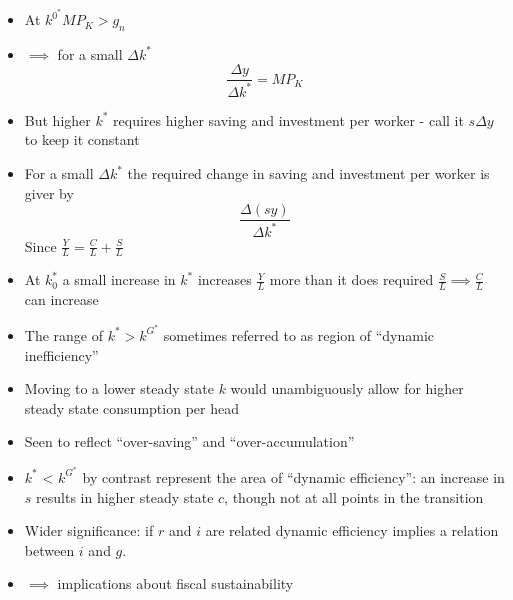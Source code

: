 \documentclass{article}
\begin{document}
	\begin{itemize}
		\item At \( k^{0^\ast} MP_K > g_n \)
		\item \( \implies \) for a small \( \Delta k^\ast \)
		\[
			\frac{\Delta y}{\Delta k^\ast} = MP_K
		\]
		\item But higher \( k^\ast \) requires higher saving and investment per worker - call it \( s \Delta y \) to keep it constant
		\item For a small \( \Delta k^\ast \) the required change in saving and investment per worker is giver by
		\[
			\frac{\Delta (sy)}{\Delta k^\ast}
		\]
		Since \( \frac{Y}{L} = \frac{C}{L} + \frac{S}{L} \)
		\item At \( k^\ast_0 \) a small increase in \( k^\ast \) increases \( \frac{Y}{L} \) more than it does required \( \frac{S}{L} \implies \frac{C}{L} \) can increase
		\item The range of \( k^\ast > k^{G^\ast} \) sometimes referred to as region of ``dynamic inefficiency''
		\item Moving to a lower steady state \( k \) would unambiguously allow for higher steady state consumption per head
		\item Seen to reflect ``over-saving'' and ``over-accumulation''
		\item \( k^\ast \) < \( k^{G^\ast} \) by contrast represent the area of ``dynamic efficiency'': an increase in \( s \) results in higher steady state \( c \), though not at all points in the transition
		\item Wider significance: if \( r \) and \( i \) are related dynamic efficiency implies a relation between \( i \) and \( g \).
		\item \( \implies \) implications about fiscal sustainability
	\end{itemize}
\end{document}
